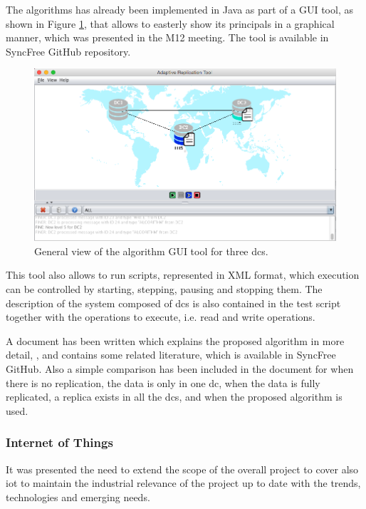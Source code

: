 \documentclass[12pt,twoside]{article}
\begin{document}
The algorithms has already been implemented in Java as part of a GUI tool, as shown in Figure \ref{fig:gui-tool}, that allows to easterly show its principals in a graphical manner, which was presented in the M12 meeting. The tool is available in SyncFree GitHub repository.
\begin{figure}[ht!]
	\centering
	\includegraphics[width=1\textwidth]{figures/adaptiveLocationOfReplicas.png}
		
	\caption{General view of the algorithm GUI tool for three \glspl{dc}.}
	\label{fig:gui-tool}
\end{figure}
This tool also allows to run scripts, represented in XML format, which execution can be controlled by starting, stepping, pausing and stopping them. The description of the system composed of \glspl{dc} is also contained in the test script together with the operations to execute, i.e. read and write operations.

A document has been written which explains the proposed algorithm in more detail, \cite{Asco2014b}, and contains some related literature, which is available in SyncFree GitHub. Also a simple comparison has been included in the document for when there is no replication, the data is only in one \gls{dc}, when the data is fully replicated, a replica exists in all the \glspl{dc}, and when the proposed algorithm is used.\\


\subsubsection{Internet of Things}
It was presented the need to extend the scope of the overall project to cover also \gls{iot} to maintain the industrial relevance of the project up to date with the trends, technologies and emerging needs.
\end{document}
